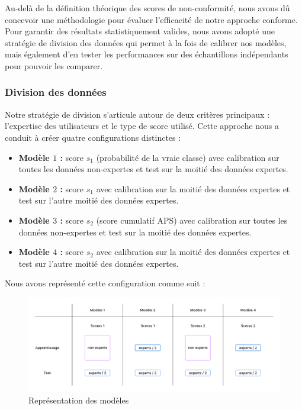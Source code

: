 \documentclass[a4paper,12pt]{article}
\begin{document}
Au-delà de la définition théorique des scores de non-conformité, nous avons dû concevoir une méthodologie pour évaluer l'efficacité de notre approche conforme. Pour garantir des résultats statistiquement valides, nous avons adopté une stratégie de division des données qui permet à la fois de calibrer nos modèles, mais également d'en tester les performances sur des échantillons indépendants pour pouvoir les comparer.

\subsubsection{Division des données}

Notre stratégie de division s'articule autour de deux critères principaux : l'expertise des utilisateurs et le type de score utilisé. Cette approche nous a conduit à créer quatre configurations distinctes : 
\begin{itemize}
    \item \textbf{Modèle $1$ :} score $s_1$ (probabilité de la vraie classe) avec calibration sur toutes les données non-expertes et test sur la moitié des données expertes.
    \item \textbf{Modèle $2$ :} score $s_1$ avec calibration sur la moitié des données expertes et test sur l'autre moitié des données expertes.
    \item \textbf{Modèle $3$ :} score $s_2$ (score cumulatif APS) avec calibration sur toutes les données non-expertes et test sur la moitié des données expertes.
    \item \textbf{Modèle $4$ :} score $s_2$ avec calibration sur la moitié des données expertes et test sur l'autre moitié des données expertes.
\end{itemize}

\vspace{0.2cm}

Nous avons représenté cette configuration comme suit : 
\begin{figure}[H]
    \centering
    \includegraphics[scale=0.6]{images/Models.png}
    \caption{Représentation des modèles}
    \label{models}
  \end{figure}
\end{document}
